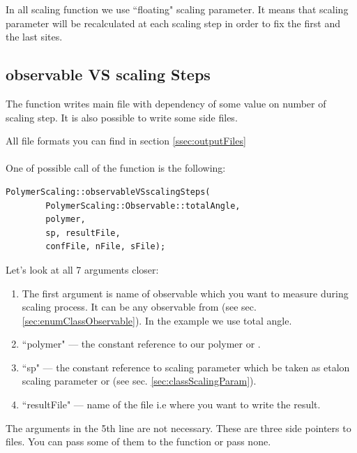 \documentclass[12pt]{article}
\begin{document}
\begin{mySection}\label{sec:scalingFunctions}
In all scaling function we use ``floating" scaling parameter. It means that scaling parameter will be recalculated at each scaling step in order to fix the first and the last sites. 
\subsection{observable VS scaling Steps}\label{sec:observableVSscalingStep}
The function writes main file with dependency of some value on number of scaling step. It is also possible to write some side files. 

All file formats you can find in section \ref{ssec:outputFiles}
\\
\\
One of possible call of the function is the following:
\begin{lstlisting}
PolymerScaling::observableVSscalingSteps(
		PolymerScaling::Observable::totalAngle,
		polymer,
		sp, resultFile, 
		confFile, nFile, sFile);
\end{lstlisting}

Let's look at all 7 arguments closer:

\begin{enumerate}
\item The first argument is name of observable which you want to measure during scaling process. It can be any observable from  (see sec. \ref{sec:enumClassObservable}). In the example we use total angle.

\item ``polymer" ---  the constant reference to our polymer or . 

\item ``sp"  --- the constant reference to scaling parameter which be taken as etalon scaling parameter or  (see sec. \ref{sec:classScalingParam}). 

\item ``resultFile" --- name of the file i.e   where you want to write the result.
\end{enumerate}
The arguments in the 5th line are not necessary. These are three side pointers to files. You can pass some of them to the function or pass none. 


\end{mySection}
\end{document}
